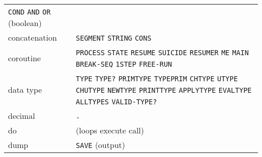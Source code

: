 \documentclass[a4paper]{scrbook}
\begin{document}
\begin{longtable}[]{@{}ll@{}}
\begin{minipage}[t]{0.83\columnwidth}
\texttt{COND} \texttt{AND} \texttt{OR} (boolean)\strut
\end{minipage}\tabularnewline
\begin{minipage}[t]{0.11\columnwidth}\raggedright\strut
concatenation\strut
\end{minipage} & \begin{minipage}[t]{0.83\columnwidth}\raggedright\strut
\texttt{SEGMENT} \texttt{STRING} \texttt{CONS}\strut
\end{minipage}\tabularnewline
\begin{minipage}[t]{0.11\columnwidth}\raggedright\strut
coroutine\strut
\end{minipage} & \begin{minipage}[t]{0.83\columnwidth}\raggedright\strut
\texttt{PROCESS} \texttt{STATE} \texttt{RESUME} \texttt{SUICIDE} \texttt{RESUMER} \texttt{ME} \texttt{MAIN}
\texttt{BREAK-SEQ} \texttt{1STEP} \texttt{FREE-RUN}\strut
\end{minipage}\tabularnewline
\begin{minipage}[t]{0.11\columnwidth}\raggedright\strut
data type\strut
\end{minipage} & \begin{minipage}[t]{0.83\columnwidth}\raggedright\strut
\texttt{TYPE} \texttt{TYPE?} \texttt{PRIMTYPE} \texttt{TYPEPRIM} \texttt{CHTYPE} \texttt{UTYPE} \texttt{CHUTYPE}
\texttt{NEWTYPE} \texttt{PRINTTYPE} \texttt{APPLYTYPE} \texttt{EVALTYPE} \texttt{ALLTYPES} \texttt{VALID-TYPE?}\strut
\end{minipage}\tabularnewline
\begin{minipage}[t]{0.11\columnwidth}\raggedright\strut
decimal\strut
\end{minipage} & \begin{minipage}[t]{0.83\columnwidth}\raggedright\strut
\texttt{.}\strut
\end{minipage}\tabularnewline
\begin{minipage}[t]{0.11\columnwidth}\raggedright\strut
do\strut
\end{minipage} & \begin{minipage}[t]{0.83\columnwidth}\raggedright\strut
(loops execute call)\strut
\end{minipage}\tabularnewline
\begin{minipage}[t]{0.11\columnwidth}\raggedright\strut
dump\strut
\end{minipage} & \begin{minipage}[t]{0.83\columnwidth}\raggedright\strut
\texttt{SAVE} (output)\strut
\end{minipage}\tabularnewline

\end{longtable}
\end{document}
